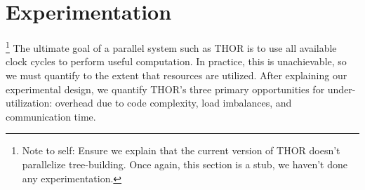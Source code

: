 \documentclass[twoside,leqno,twocolumn]{article}
\newcommand{\authornote}[1]{\footnote{Note to self: #1}}
\newcommand{\authorsnote}[1]{\authornote{#1}}
\begin{document}







\section{Experimentation}

\authorsnote{Ensure we explain that the current version of THOR doesn't parallelize tree-building.
Once again, this section is a stub, we haven't done any experimentation.}
The ultimate goal of a parallel system such as THOR is to use all available clock cycles to perform useful computation.
In practice, this is unachievable, so we must quantify to the extent that resources are utilized.
After explaining our experimental design, we quantify THOR's three primary opportunities for under-utilization: overhead due to code complexity, load imbalances, and communication time.
\end{document}
